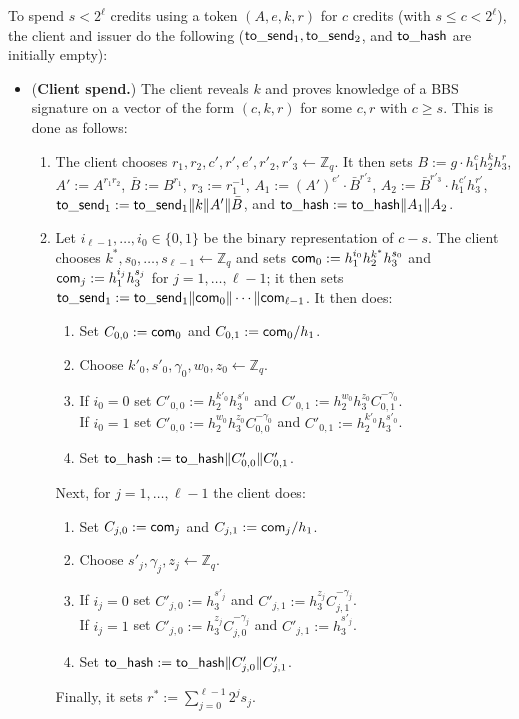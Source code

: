 \documentclass[11pt]{article}
\def\com{{\sf com}}
\def\send{{\sf to}\mbox{\_}{\sf send}}
\def\hash{{\sf to}\mbox{\_}{\sf hash}}
\def\Z{{\mathbb Z}}
\def\bool{\{0,1\}}
\def\Z{{\mathbb Z}}
\begin{document}
\medskip{}
To spend $s<2^\ell$ credits using a token $(A, e, k, r)$ for $c$ credits (with $s \leq c< 2^\ell$), the client and issuer do the following ($\send_1, \send_2$, and $\hash$ are initially empty):
\begin{itemize}
    \item ({\bf Client spend.}) The client reveals $k$ and proves knowledge of a BBS signature on a vector of the form $(c, k, r)$ for some $c, r$ with $c \geq s$. This is done as follows:
    \begin{enumerate}
        \item The client chooses $r_1, r_2, c', r', e', r'_2, r'_3 \leftarrow \Z_q$. It then sets $B:= g \cdot h_1^c h_2^k h_3^r$, $A':=A^{r_1 r_2}$, $\bar B:=B^{r_1}$, $r_3 := r_1^{-1}$,
 $A_1:=(A')^{e'} \cdot \bar B^{r'_2}$, $A_2:= \bar B^{r'_3} \cdot h_1^{c'} h_3^{r'}$, $\send_1:=\send_1\|k\|A'\|\bar B$, and $\hash:=\hash\|A_1\|A_2$.
 
 \item Let $i_{\ell-1}, \ldots, i_0 \in \bool$ be the binary representation of $c-s$. %
The client chooses $k^*, s_0, \ldots, s_{\ell-1} \leftarrow \Z_q$ and sets
$\com_0:=h_1^{i_0} h_2^{k^*} h_3^{s_0}$ and
$\com_j:=h_1^{i_j} h_3^{s_j}$ for $j=1, \ldots, \ell-1$; it then sets $\send_1:=\send_1\|\com_0\|\cdots \|\com_{\ell-1}$.
It then does:
\begin{enumerate}
        \item Set $C_{0,0}:=\com_0$ and $C_{0,1} :=\com_0/h_1$.     
        \item Choose $k'_0, s'_0, \gamma_0, w_0, z_0 \leftarrow \Z_q$.
        \item If $i_0=0$ set $C'_{0,0} := h_2^{k'_0} h_3^{s'_0}$ and $C'_{0,1}:= h_2^{w_0} h_3^{z_0} C_{0,1}^{-\gamma_0}$.\\
              If $i_0=1$ set $C'_{0,0} := h_2^{w_0} h_3^{z_0} C_{0,0}^{-\gamma_0}$ and $C'_{0,1}:= h_2^{k'_0} h_3^{s'_0}$.
        \item Set $\hash:=\hash\|C'_{0,0} \| C'_{0,1}$.
        \end{enumerate}
Next, for $j=1, \ldots, \ell-1$ the client does: \begin{enumerate}
        \item Set $C_{j,0}:=\com_j$ and $C_{j,1} :=\com_j/h_1$.     
        \item Choose $s'_j, \gamma_j, z_j \leftarrow \Z_q$.
        \item If $i_j=0$ set $C'_{j,0} := h_3^{s'_j}$ and $C'_{j,1}:=h_3^{z_j} C_{j,1}^{-\gamma_j}$.\\
              If $i_j=1$ set $C'_{j,0} := h_3^{z_j} C_{j,0}^{-\gamma_j}$ and $C'_{j,1}:=h_3^{s'_j}$.
        \item Set $\hash:=\hash\|C'_{j,0} \| C'_{j,1}$.
        \end{enumerate}
        Finally, it sets  
        $r^* := \sum_{j=0}^{\ell-1} 2^j s_j$.
        

\end{enumerate}
\end{itemize}
\end{document}
